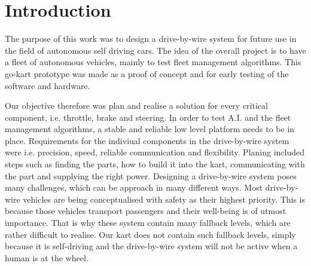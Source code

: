 
\chapter{Introduction}
\label{chp:Introduction}


The purpose of this work was to design a drive-by-wire system for future use in the field of autonomous self driving cars. The idea of the overall project is to have a fleet of autonomous vehicles, mainly to test fleet management algorithms. %
This go-kart prototype was made as a proof of concept and for early testing of the software and hardware.

Our objective therefore was plan and realise a solution for every critical component, i.e. throttle, brake and steering. In order to test A.I. and the fleet management algorithms, a stable and reliable low level platform needs to be in place. Requirements for the indiviual components in the drive-by-wire system were i.e. precision, speed, reliable communication and flexibility. Planing included steps such as finding the parts, how to build it into the kart, communicating with the part and supplying the right power.
Designing a drive-by-wire system poses many challenges, which can be approach in many different ways. Most drive-by-wire vehicles are being conceptualised with safety as their highest priority. This is because those vehicles transport passengers and their well-being is of utmost importance. That is why these system contain many fallback levels, which are rather difficult to realise. Our kart does not contain such fallback levels, simply because it is self-driving and the drive-by-wire system will not be active when a human is at the wheel. 


